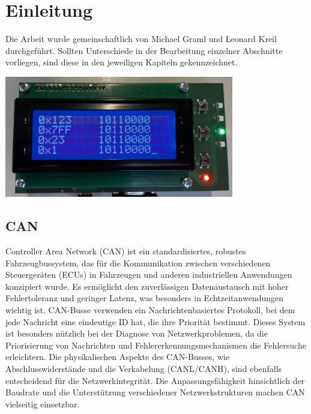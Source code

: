 \chapter{Einleitung}
\label{sec:Einleitung}
\noindent Die Arbeit wurde gemeinschaftlich von Michael Graml und Leonard Kreil durchgeführt. Sollten Unterschiede in der Bearbeitung einzelner Abschnitte vorliegen, sind diese in den jeweiligen Kapiteln gekennzeichnet.\\

\begin {centering}
\includegraphics[width=0.75\textwidth]{img/Can_to_go_system.png}
\label{fig: CAN-to-go System}
\end {centering}  


\section{CAN}
Controller Area Network (CAN) ist ein standardisiertes, robustes Fahrzeugbussystem, das für die Kommunikation zwischen verschiedenen Steuergeräten (ECUs) in Fahrzeugen und anderen industriellen Anwendungen konzipiert wurde. Es ermöglicht den zuverlässigen Datenaustausch mit hoher Fehlertoleranz und geringer Latenz, was besonders in Echtzeitanwendungen wichtig ist. CAN-Busse verwenden ein Nachrichtenbasiertes Protokoll, bei dem jede Nachricht eine eindeutige ID hat, die ihre Priorität bestimmt. Dieses System ist besonders nützlich bei der Diagnose von Netzwerkproblemen, da die Priorisierung von Nachrichten und Fehlererkennungsmechanismen die Fehlersuche erleichtern. Die physikalischen Aspekte des CAN-Busses, wie Abschlusswiderstände und die Verkabelung (CANL/CANH), sind ebenfalls entscheidend für die Netzwerkintegrität. Die Anpassungsfähigkeit hinsichtlich der Baudrate und die Unterstützung verschiedener Netzwerkstrukturen machen CAN vielseitig einsetzbar.\\

